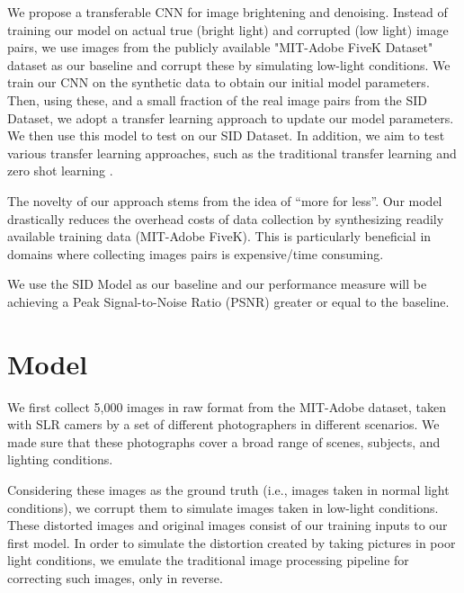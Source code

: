 \documentclass{article}
\begin{document}
We propose a transferable CNN for image brightening and denoising. Instead
of training our model on actual true (bright light) and corrupted
(low light) image pairs, we use images from the publicly available "MIT-Adobe FiveK Dataset" dataset as our baseline and corrupt these by simulating low-light conditions. We train our CNN on the synthetic data to obtain our initial model
parameters. Then, using these, and a small fraction of the real image pairs
from the SID Dataset, we adopt a transfer learning
\cite{Goodfellow-et-al-2016} approach to update our
model parameters. We then use this model to test on our SID Dataset. In
addition, we aim to test various transfer learning approaches, such as the
traditional transfer learning and zero shot learning \cite{larochelle2008,
  Palatucci:2009:ZLS:2984093.2984252, socher2013zeroshot}.


The novelty of our approach stems from the idea of ``more for less''. Our
model drastically reduces the overhead costs of data collection by
synthesizing readily available training data (MIT-Adobe FiveK). This is
particularly beneficial in domains where collecting images pairs is
expensive/time consuming. 


We use the SID Model as our baseline and our performance measure will be achieving a Peak Signal-to-Noise Ratio (PSNR) greater or equal to the baseline.

\section{Model}

We first collect 5,000 images in raw format from the MIT-Adobe dataset, taken with SLR camers by a set of different photographers in different scenarios. We made sure that these photographs cover a broad range of scenes, subjects, and lighting conditions. 

Considering these images as the ground truth (i.e., images taken in normal light conditions), we corrupt them to simulate images taken in low-light conditions. These distorted images and original images consist of our training inputs to our first model. 
In order to simulate the distortion created by taking pictures in poor light conditions, we emulate the traditional image processing pipeline for correcting such images, only in reverse. 
\end{document}
